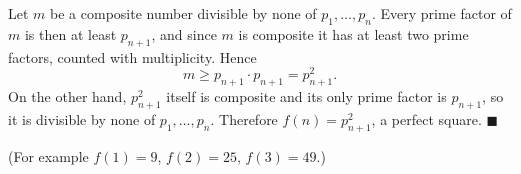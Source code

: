 Let $m$ be a composite number divisible by none of $p_1,\dots,p_n$. Every prime factor of $m$ is then at least $p_{n+1}$, and since $m$ is composite it has at least two prime factors, counted with multiplicity. Hence
\[m\ge p_{n+1}\cdot p_{n+1}=p_{n+1}^2.\]
On the other hand, $p_{n+1}^2$ itself is composite and its only prime factor is $p_{n+1}$, so it is divisible by none of $p_1,\dots,p_n$. Therefore $f(n)=p_{n+1}^2$, a perfect square. $\blacksquare$

(For example $f(1)=9$, $f(2)=25$, $f(3)=49$.)
